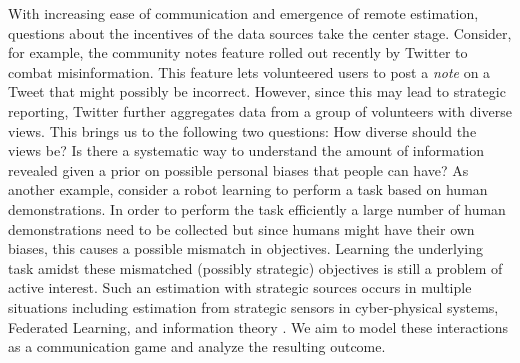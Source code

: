 \documentclass[12pt,journal,onecolumn]{IEEEtran}
\begin{document}
With increasing ease of communication and emergence of remote estimation, questions about the incentives of the data sources take the center stage. Consider, for example, the community notes feature rolled out recently by Twitter to combat misinformation. This feature lets volunteered users to post a \textit{note} on a Tweet that might possibly be incorrect. However, since this may lead to strategic reporting, Twitter further aggregates data from a group of volunteers with diverse views. This brings us to the following two questions: How diverse should the views be? Is there a systematic way to understand the amount of information revealed given a prior on possible personal biases that people can have? As another example, consider a robot learning to perform a task based on human demonstrations. In order to perform the task efficiently a large number of human demonstrations need to be collected but since humans might have their own biases, this causes a possible mismatch in objectives\cite{kostrikov2018discriminator}. 
Learning the underlying task amidst these mismatched (possibly strategic) objectives is still a problem of active interest\cite{arora2021survey}. Such an estimation with strategic sources occurs in multiple situations including estimation from strategic sensors in cyber-physical systems, Federated Learning, and information theory \cite{bhagoji2019analyzing,kashyap2007quantized,milgrom1986relying}. We aim to %
model these interactions as a communication game and analyze the resulting outcome.

\end{document}
